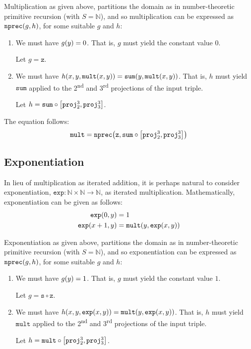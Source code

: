 Multiplication as given above, partitions the domain as in number-theoretic
primitive recursion (with $S = \mathbb{N}$), and so multiplication can be
expressed as $\mathtt{nprec}{\mathopen{}\left({g,h}\right)\mathclose{}}$, for some suitable $g$ and $h$:

\begin{enumerate}[label=(\arabic*)]

\item We must have $g{\mathopen{}\left({y}\right)\mathclose{}} = 0$. That is, $g$ must yield the constant value $0$.

Let $g = \mathtt{z}$.

\item We must have $h{\mathopen{}\left({x,y,\mathtt{mult}{\mathopen{}\left({x,y}\right)\mathclose{}}}\right)\mathclose{}} =
\mathtt{sum}{\mathopen{}\left({y,\mathtt{mult}{\mathopen{}\left({x,y}\right)\mathclose{}}}\right)\mathclose{}}$. That is, $h$ must yield $\mathtt{sum}$
applied to the 2\textsuperscript{nd} and 3\textsuperscript{rd} projections of
the input triple.

Let $h = \mathtt{sum} \circ \mathopen{}\left[{\mathtt{proj}^3_2, \mathtt{proj}^3_3}\right]\mathclose{}$.

\end{enumerate}

The equation follows:\begin{align*}
%
\mathtt{mult} = \mathtt{nprec}\p{\mathtt{z}, \mathtt{sum} \circ
\seq{\mathtt{proj}^3_2, \mathtt{proj}^3_3}}
%
\end{align*}

\subsection{Exponentiation}

In lieu of multiplication as iterated addition, it is perhaps natural to
consider exponentiation, $\mathtt{exp} : \mathbb{N} \times \mathbb{N}
\rightarrow \mathbb{N}$, as iterated multiplication.  Mathematically,
exponentiation can be given as follows:\begin{align*}
%
\mathtt{exp}\p{0, y} &= 1 \\
%
\mathtt{exp}\p{x+1, y} &= \mathtt{mult}\p{y, \mathtt{exp}\p{x,y}}
%
\end{align*}

Exponentiation as given above, partitions the domain as in number-theoretic
primitive recursion (with $S = \mathbb{N}$), and so exponentiation can be
expressed as $\mathtt{nprec}{\mathopen{}\left({g,h}\right)\mathclose{}}$, for some suitable $g$ and $h$:

\begin{enumerate}[label=(\arabic*)]

\item We must have $g{\mathopen{}\left({y}\right)\mathclose{}} = 1$. That is, $g$ must yield the constant value $1$.

Let $g = \mathtt{s} \circ \mathtt{z}$.

\item We must have $h{\mathopen{}\left({x,y,\mathtt{exp}{\mathopen{}\left({x,y}\right)\mathclose{}}}\right)\mathclose{}} = \mathtt{mult}{\mathopen{}\left({y,
\mathtt{exp}{\mathopen{}\left({x,y}\right)\mathclose{}}}\right)\mathclose{}}$. That is, $h$ must yield $\mathtt{mult}$ applied to the
2\textsuperscript{nd} and 3\textsuperscript{rd} projections of the input
triple.

Let $h = \mathtt{mult} \circ \mathopen{}\left[{\mathtt{proj}^3_2,\mathtt{proj}^3_3}\right]\mathclose{}$.

\end{enumerate}

